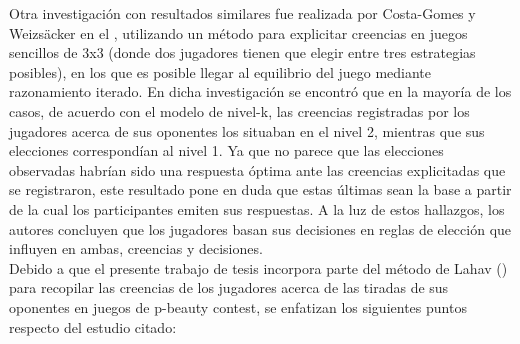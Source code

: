 Otra investigación con resultados similares fue realizada por Costa-Gomes y Weizsäcker en el \citeyear{Costa-Gomes}, utilizando un método para explicitar creencias en juegos sencillos de 3x3 (donde dos jugadores tienen que elegir entre tres estrategias posibles), en los que es posible llegar al equilibrio del juego mediante razonamiento iterado. En dicha investigación se encontró que en la mayoría de los casos, de acuerdo con el modelo de nivel-k, las creencias registradas por los jugadores acerca de sus oponentes los situaban en el nivel 2, mientras que sus elecciones correspondían al nivel 1. Ya que no parece que las elecciones observadas habrían sido una respuesta óptima ante las creencias explicitadas que se registraron, este resultado pone en duda que estas últimas sean la base a partir de la cual los participantes emiten sus respuestas. A la luz de estos hallazgos, los autores concluyen que los jugadores basan sus decisiones en reglas de elección que influyen en ambas, creencias y decisiones.\\

Debido a que el presente trabajo de tesis incorpora parte del método de Lahav (\citeyear{Lahav}) para recopilar las creencias de los jugadores acerca de las tiradas de sus oponentes en juegos de p-beauty contest, se enfatizan los siguientes puntos respecto del estudio citado: \\

